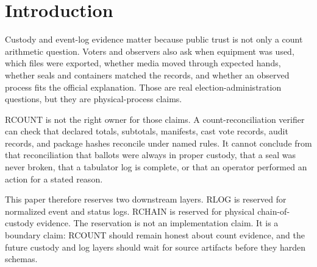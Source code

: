 \section{Introduction}

Custody and event-log evidence matter because public trust is not only a count
arithmetic question. Voters and observers also ask when equipment was used,
which files were exported, whether media moved through expected hands, whether
seals and containers matched the records, and whether an observed process fits
the official explanation. Those are real election-administration questions, but
they are physical-process claims.

RCOUNT is not the right owner for those claims. A count-reconciliation verifier
can check that declared totals, subtotals, manifests, cast vote records, audit
records, and package hashes reconcile under named rules. It cannot conclude
from that reconciliation that ballots were always in proper custody, that a
seal was never broken, that a tabulator log is complete, or that an operator
performed an action for a stated reason.

This paper therefore reserves two downstream layers. RLOG is reserved for
normalized event and status logs. RCHAIN is reserved for physical
chain-of-custody evidence. The reservation is not an implementation claim. It
is a boundary claim: RCOUNT should remain honest about count evidence, and the
future custody and log layers should wait for source artifacts before they
harden schemas.
